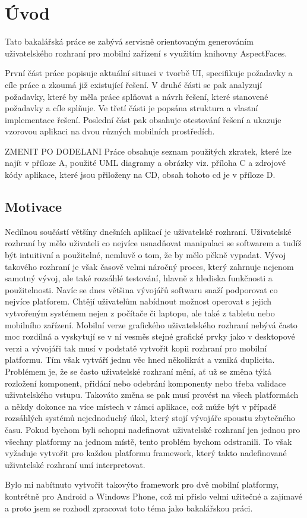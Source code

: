 \chapter{Úvod}
Tato bakalářská práce se zabývá servisně orientovaným generováním uživatelského rozhraní pro mobilní zařízení s využitím knihovny AspectFaces. 

První část práce popisuje aktuální situaci v tvorbě UI, specifikuje požadavky a cíle práce a zkoumá již existující řešení. V druhé části se pak analyzují požadavky, které by měla práce splňovat a návrh řešení, které stanovené požadavky a cíle splňuje. Ve třetí části je popsána struktura a vlastní implementace řešení. Poslední část pak obsahuje otestování řešení a ukazuje vzorovou aplikaci na dvou různých mobilních prostředích.

ZMENIT PO DODELANI
Práce obsahuje seznam použitých zkratek, které lze najít v příloze A, použité UML diagramy a obrázky viz. příloha C a zdrojové kódy
aplikace, které jsou přiloženy na CD, obsah tohoto cd je v příloze D.
 

\section{Motivace}
Nedílnou součástí většíny dnešních aplikací je uživatelské rozhraní. Uživatelské rozhraní by mělo uživateli co nejvíce usnadňovat manipulaci se softwarem a tudíž být intuitivní a použitelné, nemluvě o tom, že by mělo pěkně vypadat. Vývoj takového rozhraní je však časově velmi náročný proces, který zahrnuje nejenom samotný vývoj, ale také rozsáhlé testování, hlavně z hlediska funkčnosti a použitelnosti. Navíc se dnes většina vývojářů softwaru snaží podporovat co nejvíce platforem. Chtějí uživatelům nabídnout možnost operovat s jejich vytvořeným systémem nejen z počítače či laptopu, ale také z tabletu nebo mobilního zařízení. Mobilní verze grafického uživatelského rozhraní nebývá často moc rozdílná a vyskytují se v ní vesměs stejné grafické prvky jako v desktopové verzi a vývojáři tak musí v podstatě vytvořit kopii rozhraní pro mobilní platformu. Tím však vytváří jednu věc hned několikrát a vzniká duplicita. Problémem je, že se často uživatelské rozhraní mění, ať už se změna týká rozložení komponent, přidání nebo odebrání komponenty nebo třeba validace uživatelského vstupu. Takováto změna se pak musí provést na všech platformách a někdy dokonce na více místech v rámci aplikace, což může být v případě rozsáhlých systémů nejednoduchý úkol, který stojí vývojáře spoustu zbytečného času. Pokud bychom byli schopni nadefinovat uživatelské rozhraní jen jednou pro všechny platformy na jednom místě, tento problém bychom odstranili. To však vyžaduje vytvořit pro každou platformu framework, který takto nadefinované uživatelské rozhraní umí interpretovat. 

Bylo mi nabítnuto vytvořit takovýto framework pro dvě mobilní platformy, kontrétně pro Android a Windows Phone, což mi přislo velmi užitečné a zajímavé a proto jsem se rozhodl zpracovat toto téma jako bakalářskou práci.
